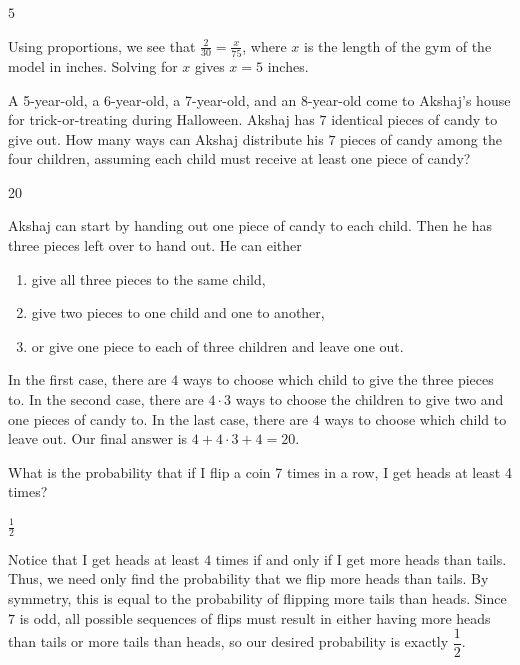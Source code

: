 \documentclass[11pt]{article}
\begin{document}
\begin{answer}
$5$
\end{answer}

\begin{solution}
Using proportions, we see that $\frac{2}{30} = \frac{x}{75}$, where $x$ is the length of the gym of the model in inches. Solving for $x$ gives $x=\boxed{5}$ inches.
\end{solution}


\begin{problem}
A 5-year-old, a 6-year-old, a 7-year-old, and an 8-year-old come to Akshaj's house for trick-or-treating during Halloween. Akshaj has $7$ identical pieces of candy to give out. How many ways can Akshaj distribute his $7$ pieces of candy among the four children, assuming each child must receive at least one piece of candy?
\end{problem}

\begin{answer}
20
\end{answer}

\begin{solution}
Akshaj can start by handing out one piece of candy to each child. Then he has three pieces left over to hand out. He can either \begin{enumerate} \item give all three pieces to the same child, \item give two pieces to one child and one to another, \item or give one piece to each of three children and leave one out. \end{enumerate}
In the first case, there are $4$ ways to choose which child to give the three pieces to. In the second case, there are $4 \cdot 3$ ways to choose the children to give two and one pieces of candy to. In the last case, there are $4$ ways to choose which child to leave out. Our final answer is $4 + 4 \cdot 3 + 4 = \boxed{20}$.
\end{solution}


\begin{problem}
What is the probability that if I flip a coin 7 times in a row, I get heads at least 4 times?
\end{problem}

\begin{answer}
$\frac{1}{2}$
\end{answer}

\begin{solution}
Notice that I get heads at least $4$ times if and only if I get more heads than tails. Thus, we need only find the probability that we flip more heads than tails. By symmetry, this is equal to the probability of flipping more tails than heads. Since $7$ is odd, all possible sequences of flips must result in either having more heads than tails or more tails than heads, so our desired probability is exactly $\boxed{\dfrac{1}{2}}$.
\end{solution}
\end{document}
